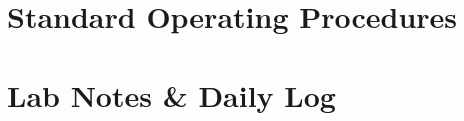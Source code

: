 \documentclass[twoside]{article}
\begin{document}
	
	\newcommand{\HRule}{\rule{\linewidth}{0.5mm}}
	
	\newcommand{\e}[1]{\ensuremath{\times 10^{#1}}}

	\pagestyle{style1}
	
	\setcounter{page}{1}
	

	\part{Standard Operating Procedures}
	

	\clearpage
	\pagestyle{style2}
	\part{Lab Notes \& Daily Log}
	

	
	
	
	
	
	
	
	
	
	
	
\end{document}
